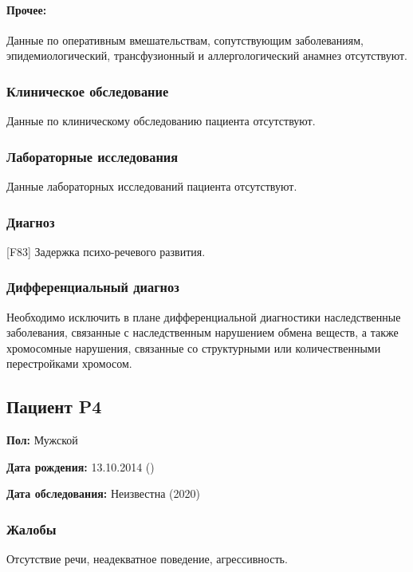 \documentclass[a4paper,14pt]{extarticle}
\newcommand{\DS}[2]{[#2] #1}
\begin{document}
\paragraph{Прочее:} Данные по оперативным вмешательствам, сопутствующим заболеваниям, эпидемиологический, трансфузионный и аллергологический анамнез отсутствуют.

\subsubsection*{Клиническое обследование}

Данные по клиническому обследованию пациента отсутствуют.

\subsubsection*{Лабораторные исследования}

Данные лабораторных исследований пациента отсутствуют.

\subsubsection*{Диагноз}

\DS{Задержка психо-речевого развития}{F83}.

\subsubsection*{Дифференциальный диагноз}

Необходимо исключить в плане дифференциальной диагностики наследственные заболевания, связанные  с наследственным нарушением обмена веществ, а также хромосомные нарушения, связанные со структурными или количественными перестройками хромосом.

\newpage
\subsection*{Пациент P4}

\textbf{Пол:} Мужской

\textbf{Дата рождения:} 13.10.2014 ()

\textbf{Дата обследования:} Неизвестна (2020) 

\subsubsection*{Жалобы}

Отсутствие речи, неадекватное поведение, агрессивность.
\end{document}
